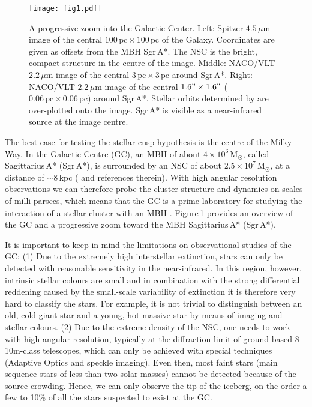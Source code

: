 \documentclass[a4paper]{jpconf}
\begin{document}
\begin{figure}[htb]
\label{Fig:overview}
\texttt{[image: fig1.pdf]}
\caption{A progressive zoom into the Galactic Center. Left: Spitzer
  $4.5\,\mu$m image \cite{Stolovy:2006fk} of the central
  $100\,\mathrm{pc}\times100\,\mathrm{pc}$ of the Galaxy. Coordinates
  are given as offsets from the MBH Sgr\,A*. The NSC is the
  bright, compact structure in the centre of the image. Middle:
  NACO/VLT $2.2\,\mu$m image of the central
  $3\,\mathrm{pc}\times3\,\mathrm{pc}$ around Sgr\,A*. Right: NACO/VLT
  $2.2\,\mu$m image of the central $1.6"\times1.6"$
  ($0.06\,\mathrm{pc}\times0.06\,\mathrm{pc}$) around Sgr\,A*. Stellar
  orbits determined by \cite{Gillessen:2016uq} are over-plotted onto
  the image. Sgr\,A* is visible as a near-infrared source at the image
centre.}
\end{figure}

The best case for testing the stellar cusp hypothesis is the centre of
the Milky Way. In the Galactic Centre (GC), an MBH of about
$4\times10^{6}$\,M$_{\odot}$, called Sagittarius\,A* (Sgr\,A*), is
surrounded by an NSC of about $2.5\times10^{7}$\,M$_{\odot}$, at a
distance of $\sim$8\,kpc (\cite{Genzel:2010fk,Boehle:2016zr,
  Gillessen:2016uq,Schodel:2014fk} and references therein). With high
angular resolution observations we can therefore probe the cluster
structure and dynamics on scales of milli-parsecs, which means that
the GC is a prime laboratory for studying the interaction of a stellar
cluster with an MBH \cite{Schodel:2014bn}. Figure\,\ref{Fig:overview}
provides an overview of the GC and a progressive zoom toward the MBH
Sagittarius\,A* (Sgr\,A*).

It is important to keep in mind the limitations on observational
studies of the GC: (1) Due to the extremely high interstellar
extinction, stars can only be detected with reasonable sensitivity in
the near-infrared. In this region, however, intrinsic stellar colours
are small and in combination with the strong differential reddening
caused by the small-scale variability of extinction it is therefore
very hard to classify the stars. For example, it is not trivial to
distinguish between an old, cold giant star and a young, hot massive
star by means of imaging and stellar colours. (2) Due to the extreme
density of the NSC, one needs to work with high angular resolution,
typically at the diffraction limit of ground-based 8-10m-class
telescopes, which can only be achieved with special techniques
(Adaptive Optics and speckle imaging). Even then, most faint stars
(main sequence stars of less than two solar masses) cannot be detected
because of the source crowding. Hence, we can only observe the tip of
the iceberg, on the order a few to 10\% of all the stars suspected to
exist at the GC.
\end{document}
